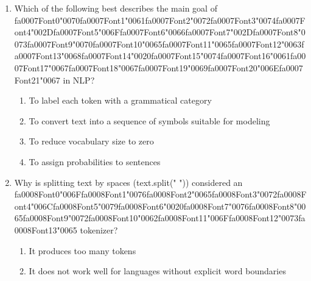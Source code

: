\documentclass[12pt]{article}
\begin{document}
\begin{enumerate}[label=Q\arabic*.]
\begin{enumerate}[label=(\Alph*)]
    \item It's the number of unique words in the corpus
\end{enumerate}
\item Which of the following best describes the main goal of {\csname fa0007Font0\endcsname\char"0070}{\csname fa0007Font1\endcsname\char"0061}{\csname fa0007Font2\endcsname\char"0072}{\csname fa0007Font3\endcsname\char"0074}{\csname fa0007Font4\endcsname\char"002D}{\csname fa0007Font5\endcsname\char"006F}{\csname fa0007Font6\endcsname\char"0066}{\csname fa0007Font7\endcsname\char"002D}{\csname fa0007Font8\endcsname\char"0073}{\csname fa0007Font9\endcsname\char"0070}{\csname fa0007Font10\endcsname\char"0065}{\csname fa0007Font11\endcsname\char"0065}{\csname fa0007Font12\endcsname\char"0063}{\csname fa0007Font13\endcsname\char"0068}{\csname fa0007Font14\endcsname\char"0020}{\csname fa0007Font15\endcsname\char"0074}{\csname fa0007Font16\endcsname\char"0061}{\csname fa0007Font17\endcsname\char"0067}{\csname fa0007Font18\endcsname\char"0067}{\csname fa0007Font19\endcsname\char"0069}{\csname fa0007Font20\endcsname\char"006E}{\csname fa0007Font21\endcsname\char"0067} in NLP?
\begin{enumerate}[label=(\Alph*)]
    \item To label each token with a grammatical category
    \item To convert text into a sequence of symbols suitable for modeling
    \item To reduce vocabulary size to zero
    \item To assign probabilities to sentences
\end{enumerate}
\item Why is splitting text by spaces (text.split(" ")) considered an {\csname fa0008Font0\endcsname\char"006F}{\csname fa0008Font1\endcsname\char"0076}{\csname fa0008Font2\endcsname\char"0065}{\csname fa0008Font3\endcsname\char"0072}{\csname fa0008Font4\endcsname\char"006C}{\csname fa0008Font5\endcsname\char"0079}{\csname fa0008Font6\endcsname\char"0020}{\csname fa0008Font7\endcsname\char"0076}{\csname fa0008Font8\endcsname\char"0065}{\csname fa0008Font9\endcsname\char"0072}{\csname fa0008Font10\endcsname\char"0062}{\csname fa0008Font11\endcsname\char"006F}{\csname fa0008Font12\endcsname\char"0073}{\csname fa0008Font13\endcsname\char"0065} tokenizer?
\begin{enumerate}[label=(\Alph*)]
    \item It produces too many tokens
    \item It does not work well for languages without explicit word boundaries

\end{enumerate}
\end{enumerate}
\end{document}
